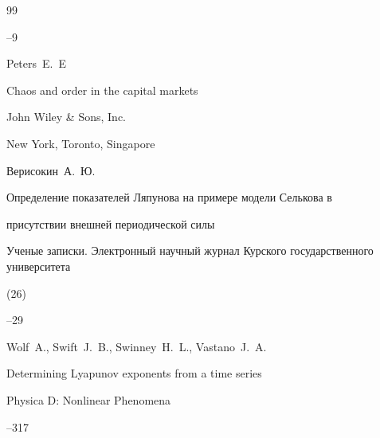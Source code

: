 \begin{thebibliography}{99}


--9





\by Peters~E.~E

\book Chaos and order in the capital markets


\publ John Wiley \& Sons, Inc.

\publaddr New York, Toronto, Singapore





\by Верисокин~А.~Ю. 

\paper Определение показателей Ляпунова на примере модели Селькова в

присутствии внешней периодической силы

\jour Ученые записки. Электронный научный журнал Курского государственного университета


(26)

--29












\by Wolf~A., Swift~J.~B.,    Swinney~H.~L.,  Vastano~J.~A.

\paper Determining Lyapunov exponents from a time series

\jour Physica D: Nonlinear Phenomena




--317





\end{thebibliography}
